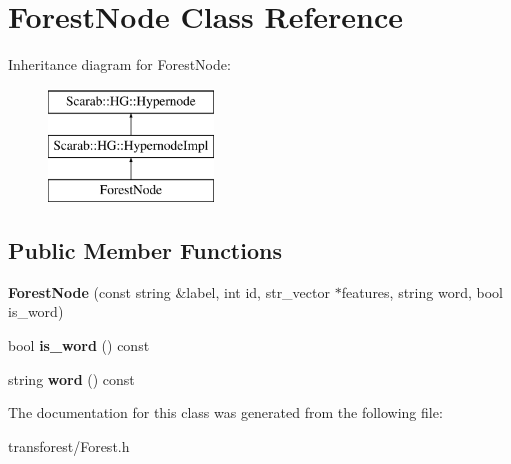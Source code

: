 \hypertarget{classForestNode}{
\section{ForestNode Class Reference}
\label{classForestNode}
}
Inheritance diagram for ForestNode:\begin{figure}[H]
\begin{center}
\leavevmode
\includegraphics[height=3cm]{classForestNode}
\end{center}
\end{figure}
\subsection*{Public Member Functions}
\begin{DoxyCompactItemize}
\item 
\hypertarget{classForestNode_aeeb649eef15a82d283ae728b0a44d183}{
{\bfseries ForestNode} (const string \&label, int id, str\_\-vector $\ast$features, string word, bool is\_\-word)}
\label{classForestNode_aeeb649eef15a82d283ae728b0a44d183}

\item 
\hypertarget{classForestNode_ab44af8003df7af0ce93b9b904301fb92}{
bool {\bfseries is\_\-word} () const }
\label{classForestNode_ab44af8003df7af0ce93b9b904301fb92}

\item 
\hypertarget{classForestNode_a18c00f9aae93bc963358e488f2cce308}{
string {\bfseries word} () const }
\label{classForestNode_a18c00f9aae93bc963358e488f2cce308}

\end{DoxyCompactItemize}


The documentation for this class was generated from the following file:\begin{DoxyCompactItemize}
\item 
transforest/Forest.h\end{DoxyCompactItemize}
